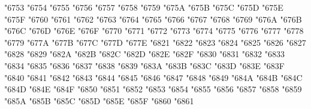 {\Uchar\jis"6753 %
\Uchar\jis"6754 %
\Uchar\jis"6755 %
\Uchar\jis"6756 %
\Uchar\jis"6757 %
\Uchar\jis"6758 %
\Uchar\jis"6759 %
\Uchar\jis"675A %
\Uchar\jis"675B %
\Uchar\jis"675C %
\Uchar\jis"675D %
\Uchar\jis"675E %
\Uchar\jis"675F %
\Uchar\jis"6760 %
\Uchar\jis"6761 %
\Uchar\jis"6762 %
\Uchar\jis"6763 %
\Uchar\jis"6764 %
\Uchar\jis"6765 %
\Uchar\jis"6766 %
\Uchar\jis"6767 %
\Uchar\jis"6768 %
\Uchar\jis"6769 %
\Uchar\jis"676A %
\Uchar\jis"676B %
\Uchar\jis"676C %
\Uchar\jis"676D %
\Uchar\jis"676E %
\Uchar\jis"676F %
\Uchar\jis"6770 %
\Uchar\jis"6771 %
\Uchar\jis"6772 %
\Uchar\jis"6773 %
\Uchar\jis"6774 %
\Uchar\jis"6775 %
\Uchar\jis"6776 %
\Uchar\jis"6777 %
\Uchar\jis"6778 %
\Uchar\jis"6779 %
\Uchar\jis"677A %
\Uchar\jis"677B %
\Uchar\jis"677C %
\Uchar\jis"677D %
\Uchar\jis"677E %
\Uchar\jis"6821 %
\Uchar\jis"6822 %
\Uchar\jis"6823 %
\Uchar\jis"6824 %
\Uchar\jis"6825 %
\Uchar\jis"6826 %
\Uchar\jis"6827 %
\Uchar\jis"6828 %
\Uchar\jis"6829 %
\Uchar\jis"682A %
\Uchar\jis"682B %
\Uchar\jis"682C %
\Uchar\jis"682D %
\Uchar\jis"682E %
\Uchar\jis"682F %
\Uchar\jis"6830 %
\Uchar\jis"6831 %
\Uchar\jis"6832 %
\Uchar\jis"6833 %
\Uchar\jis"6834 %
\Uchar\jis"6835 %
\Uchar\jis"6836 %
\Uchar\jis"6837 %
\Uchar\jis"6838 %
\Uchar\jis"6839 %
\Uchar\jis"683A %
\Uchar\jis"683B %
\Uchar\jis"683C %
\Uchar\jis"683D %
\Uchar\jis"683E %
\Uchar\jis"683F %
\Uchar\jis"6840 %
\Uchar\jis"6841 %
\Uchar\jis"6842 %
\Uchar\jis"6843 %
\Uchar\jis"6844 %
\Uchar\jis"6845 %
\Uchar\jis"6846 %
\Uchar\jis"6847 %
\Uchar\jis"6848 %
\Uchar\jis"6849 %
\Uchar\jis"684A %
\Uchar\jis"684B %
\Uchar\jis"684C %
\Uchar\jis"684D %
\Uchar\jis"684E %
\Uchar\jis"684F %
\Uchar\jis"6850 %
\Uchar\jis"6851 %
\Uchar\jis"6852 %
\Uchar\jis"6853 %
\Uchar\jis"6854 %
\Uchar\jis"6855 %
\Uchar\jis"6856 %
\Uchar\jis"6857 %
\Uchar\jis"6858 %
\Uchar\jis"6859 %
\Uchar\jis"685A %
\Uchar\jis"685B %
\Uchar\jis"685C %
\Uchar\jis"685D %
\Uchar\jis"685E %
\Uchar\jis"685F %
\Uchar\jis"6860 %
\Uchar\jis"6861 %
}
